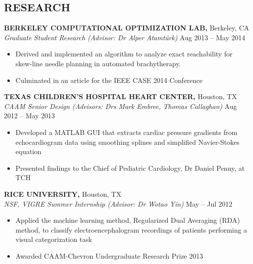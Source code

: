 \documentclass[margin]{res}
\begin{document}
\begin{resume}
\section{RESEARCH}
{\bf BERKELEY COMPUTATIONAL OPTIMIZATION LAB,} Berkeley, CA \\
{\em Graduate Student Research (Advisor: Dr Alper Atamt\"urk)} \hfill
Aug 2013 -- May 2014 \\                                          \vspace{-4mm}
\begin{itemize}                                         \itemsep1pt %
        \item    Derived and implemented an algorithm to analyze exact reachability for skew-line needle planning in automated brachytherapy.         \item     Culminated in an article for the IEEE CASE 2014 Conference
\end{itemize}
\vspace{-2mm}

{\bf TEXAS CHILDREN'S HOSPITAL HEART CENTER,} Houston, TX \\
{\em CAAM Senior Design (Advisors: Drs Mark Embree, Thomas Callaghan)} \hfill
Aug 2012 -- May 2013 \\                                          \vspace{-4mm}
\begin{itemize}                                         \itemsep1pt %
        \item  Developed a MATLAB GUI that extracts cardiac pressure gradients from echocardiogram data using smoothing splines and simplified Navier-Stokes equation 
        \item  Presented findings to the Chief of Pediatric Cardiology, Dr Daniel Penny, at TCH
\end{itemize}
\vspace{-2mm}

{\bf RICE UNIVERSITY,} Houston, TX \\
{\em NSF, VIGRE Summer Internship (Advisor: Dr Wotao Yin)}    \hfill
May -- Jul 2012 \\                                          \vspace{-4mm}
\begin{itemize}                                         \itemsep1pt 
        \item  Applied the machine learning method, Regularized Dual Averaging (RDA) method, to classify electroencephalogram  recordings of patients performing a visual categorization task
        \item Awarded CAAM-Chevron Undergraduate Research Prize
2013\end{itemize}
\vspace{-2mm}



\end{resume}
\end{document}
